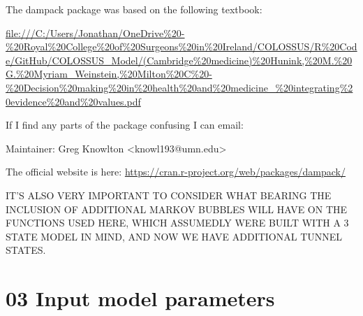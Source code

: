 \documentclass[
]{article}
\begin{document}
The dampack package was based on the following textbook:

\url{file:///C:/Users/Jonathan/OneDrive\%20-\%20Royal\%20College\%20of\%20Surgeons\%20in\%20Ireland/COLOSSUS/R\%20Code/GitHub/COLOSSUS_Model/(Cambridge\%20medicine)\%20Hunink,\%20M.\%20G.\%20Myriam_Weinstein,\%20Milton\%20C\%20-\%20Decision\%20making\%20in\%20health\%20and\%20medicine_\%20integrating\%20evidence\%20and\%20values.pdf}

If I find any parts of the package confusing I can email:

Maintainer: Greg Knowlton \textless knowl193@umn.edu\textgreater{}

The official website is here:
\url{https://cran.r-project.org/web/packages/dampack/}

IT'S ALSO VERY IMPORTANT TO CONSIDER WHAT BEARING THE INCLUSION OF
ADDITIONAL MARKOV BUBBLES WILL HAVE ON THE FUNCTIONS USED HERE, WHICH
ASSUMEDLY WERE BUILT WITH A 3 STATE MODEL IN MIND, AND NOW WE HAVE
ADDITIONAL TUNNEL STATES.

\hypertarget{input-model-parameters}{%
\section{03 Input model parameters}\label{input-model-parameters}}
\end{document}

